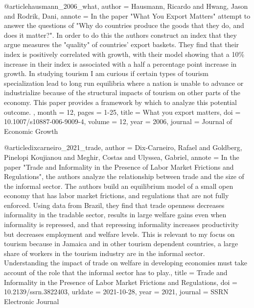 @article{hausmann_2006_what,
	author = {Hausmann, Ricardo and Hwang, Jason and Rodrik, Dani},
	annote = {In the paper "What You Export Matters" attempt to answer the questions of "Why do countries produce the goods that they do, and does it matter?". In order to do this the authors construct an index that they argue measures the "quality" of countries' export baskets. They find that their index is positively correlated with growth, with their model showing that a 10\% increase in their index is associated with a half a percentage point increase in growth. In studying tourism I am curious if certain types of tourism specialization lead to long run equilibria where a nation is unable to advance or industrialize because of the structural impacts of tourism on other parts of the economy. This paper provides a framework by which to analyze this potential outcome. },
	month = {12},
	pages = {1-25},
	title = {What you export matters},
	doi = {10.1007/s10887-006-9009-4},
	volume = {12},
	year = {2006},
	journal = {Journal of Economic Growth}
}

@article{dixcarneiro_2021_trade,
	author = {Dix-Carneiro, Rafael and Goldberg, Pinelopi Koujianou and Meghir, Costas and Ulyssea, Gabriel},
	annote = {In the paper "Trade and Informality in the Presence of Labor Market Frictions and Regulations", the authors  analyze the relationship between trade and the size of the informal sector. The authors build an equilibrium model of a small open economy that has labor market frictions, and regulations that are not fully enforced. Using data from Brazil, they find that trade openness decreases informality in the tradable sector, results in large welfare gains even when informality is repressed, and that repressing informality increases productivity but decreases employment and welfare  levels. This is relevant to my focus on tourism because in Jamaica and in other tourism dependent countries, a large share of workers in the tourism industry are in the informal sector. Understanding the impact of trade on welfare in developing economies must take account of the role that the informal sector has to play.},
	title = {Trade and Informality in the Presence of Labor Market Frictions and Regulations},
	doi = {10.2139/ssrn.3822403},
	urldate = {2021-10-28},
	year = {2021},
	journal = {SSRN Electronic Journal}
}

